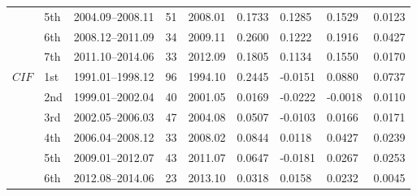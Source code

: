 \documentclass[a4paper,fleqn]{cas-sc}
\begin{document}
\begin{table}
\begin{tabular*}{\tblwidth}{@{}LLLLLLLLL@{}}
		   & 5th & 2004.09–2008.11 & 51 & 2008.01 & 0.1733 & 0.1285 & 0.1529 & 0.0123 \\
		   & 6th & 2008.12–2011.09 & 34 & 2009.11 & 0.2600 & 0.1222 & 0.1916 & 0.0427 \\
		   & 7th & 2011.10–2014.06 & 33 & 2012.09 & 0.1805 & 0.1134 & 0.1550 & 0.0170 \\
	    $CIF$ & 1st & 1991.01–1998.12 & 96 & 1994.10 & 0.2445 & -0.0151 & 0.0880 & 0.0737 \\
		& 2nd & 1999.01–2002.04 & 40 & 2001.05 & 0.0169 & -0.0222 & -0.0018 & 0.0110 \\
		& 3rd & 2002.05–2006.03 & 47 & 2004.08 & 0.0507 & -0.0103 & 0.0166 & 0.0171 \\
		& 4th & 2006.04–2008.12 & 33 & 2008.02 & 0.0844 & 0.0118 & 0.0427 & 0.0239 \\
		& 5th & 2009.01–2012.07 & 43 & 2011.07 & 0.0647 & -0.0181 & 0.0267 & 0.0253 \\
		& 6th & 2012.08–2014.06 & 23 & 2013.10 & 0.0318 & 0.0158 & 0.0232 & 0.0045 \\
	    \bottomrule
	\end{tabular*} 
\end{table}
\end{document}
